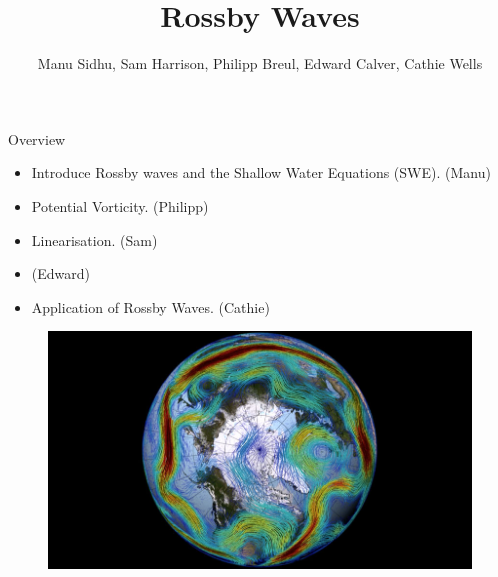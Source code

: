 \documentclass[12pt]{beamer}
\title[Rossby Waves]{Rossby Waves}
\author{Manu Sidhu, Sam Harrison, Philipp Breul, Edward Calver, Cathie Wells}
\institute{University of Reading and Imperial College London}
\begin{document}
	
	\begin{frame}
	\titlepage
\end{frame}

\begin{frame}{Overview}

\begin{itemize}
	\item Introduce Rossby waves and the Shallow Water Equations (SWE). (Manu)
	\item Potential Vorticity. (Philipp)
	\item Linearisation. (Sam)
	\item (Edward)
	\item Application of Rossby Waves. (Cathie)
\end{itemize}

\begin{figure}[H]
	\centering
	\includegraphics[width=0.5\linewidth]{Rossby_Wave.jpg}
\end{figure}   

\end{frame}
\end{document}
